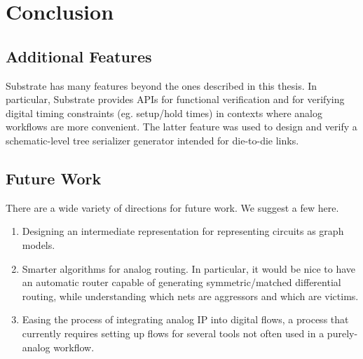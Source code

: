 \section{Conclusion}

\subsection{Additional Features}

Substrate has many features beyond the ones described in this thesis.
In particular, Substrate provides APIs for functional verification
and for verifying digital timing constraints (eg. setup/hold times)
in contexts where analog workflows are more convenient.
The latter feature was used to design and verify a schematic-level tree serializer
generator intended for die-to-die links.

\subsection{Future Work}

There are a wide variety of directions for future work.
We suggest a few here.

\begin{enumerate}
\item Designing an intermediate representation for representing circuits as graph models.
\item Smarter algorithms for analog routing. In particular, it would be nice to have 
an automatic router capable of generating symmetric/matched differential routing,
while understanding which nets are aggressors and which are victims.
\item Easing the process of integrating analog IP into digital flows, a process
that currently requires setting up flows for several tools not often used in a purely-analog workflow.
\end{enumerate}
